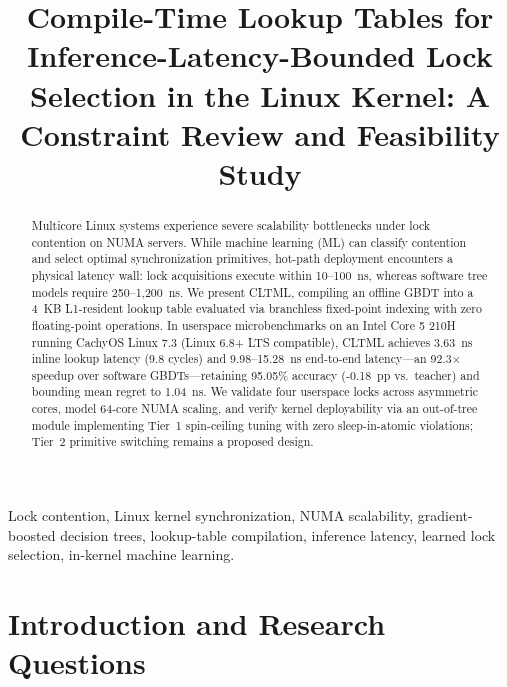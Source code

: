 \documentclass[conference]{IEEEtran}
\begin{document}
\title{Compile-Time Lookup Tables for Inference-Latency-Bounded Lock Selection in the Linux Kernel: A Constraint Review and Feasibility Study}

\author{
\and
{}
}

\maketitle

\begin{abstract}
Multicore Linux systems experience severe scalability bottlenecks under lock contention on NUMA servers. While machine learning (ML) can classify contention and select optimal synchronization primitives, hot-path deployment encounters a physical latency wall: lock acquisitions execute within 10--100~ns, whereas software tree models require 250--1,200~ns. We present CLTML, compiling an offline GBDT into a 4~KB L1-resident lookup table evaluated via branchless fixed-point indexing with zero floating-point operations. In userspace microbenchmarks on an Intel Core 5 210H running CachyOS Linux 7.3 (Linux 6.8+ LTS compatible), CLTML achieves 3.63~ns inline lookup latency (9.8 cycles) and 9.98--15.28~ns end-to-end latency---an 92.3$\times$ speedup over software GBDTs---retaining 95.05\% accuracy (-0.18~pp vs.\ teacher) and bounding mean regret to 1.04~ns. We validate four userspace locks across asymmetric cores, model 64-core NUMA scaling, and verify kernel deployability via an out-of-tree module implementing Tier~1 spin-ceiling tuning with zero sleep-in-atomic violations; Tier~2 primitive switching remains a proposed design.
\end{abstract}

\begin{IEEEkeywords}
Lock contention, Linux kernel synchronization, NUMA scalability, gradient-boosted decision trees, lookup-table compilation, inference latency, learned lock selection, in-kernel machine learning.
\end{IEEEkeywords}

\section{Introduction and Research Questions}
\end{document}
